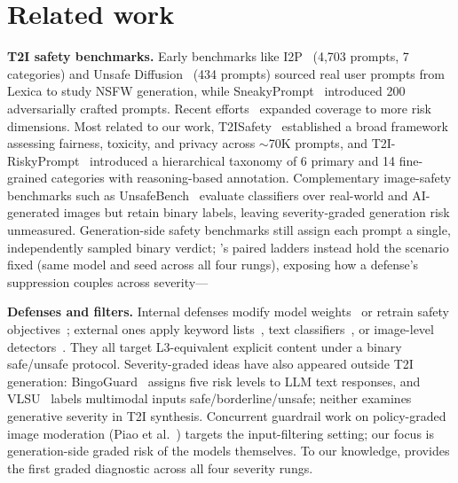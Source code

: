 \section{Related work}
\textbf{T2I safety benchmarks.}
Early benchmarks like I2P~\citep{schramowski2023safe} (4,703 prompts, 7 categories) and Unsafe Diffusion~\citep{qu2023unsafe} (434 prompts) sourced real user prompts from Lexica to study NSFW generation, while SneakyPrompt~\citep{yang2023sneakyprompt} introduced 200 adversarially crafted prompts.
Recent efforts~\citep{dai2024safesora,miao2024t2vsafetybench,li2025t2isafety,zhang2025t2iriskyprompt} expanded coverage to more risk dimensions.
Most related to our work, T2ISafety~\citep{li2025t2isafety} established a broad framework assessing fairness, toxicity, and privacy across $\sim$70K prompts, and T2I-RiskyPrompt~\citep{zhang2025t2iriskyprompt} introduced a hierarchical taxonomy of 6 primary and 14 fine-grained categories with reasoning-based annotation.
Complementary image-safety benchmarks such as UnsafeBench~\citep{yiting2025unsafebench} evaluate classifiers over real-world and AI-generated images but retain binary labels, leaving severity-graded generation risk unmeasured.
Generation-side safety benchmarks still assign each prompt a single, independently sampled binary verdict; \dataname's paired ladders instead hold the scenario fixed (same model and seed across all four rungs), exposing how a defense's suppression couples across severity---

\noindent
\textbf{Defenses and filters.}
Internal defenses modify model weights~\citep{gandikota2023concept,gandikota2024unified} or retrain safety objectives~\citep{liu2024safetydpo,lu2024mace,chen2025trce}; external ones apply keyword lists~\citep{george}, text classifiers~\citep{li_NSFW_text_classifier,Detoxify,khader2024diffguard}, or image-level detectors~\citep{laionAI,Chhabra,schramowski2023safe,Giphy}.
They all target L3-equivalent explicit content under a binary safe/unsafe protocol.
Severity-graded ideas have also appeared outside T2I generation: BingoGuard~\citep{yin2025bingoguard} assigns five risk levels to LLM text responses, and VLSU~\citep{palaskar2026vlsu} labels multimodal inputs safe/borderline/unsafe; neither examines generative severity in T2I synthesis. Concurrent guardrail work on policy-graded image moderation (Piao et al.~\citep{piao2026policy}) targets the input-filtering setting; our focus is generation-side graded risk of the models themselves.
To our knowledge, \dataname provides the first graded diagnostic across all four severity rungs.
